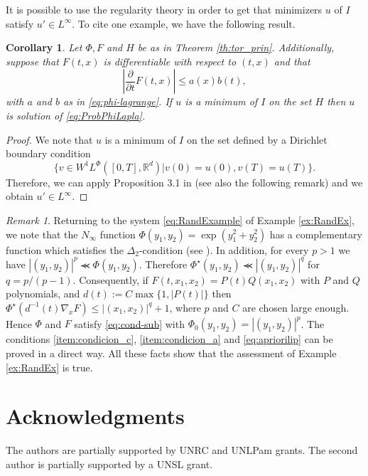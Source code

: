 \documentclass[twoside]{article}
\newtheorem{cor}[thm]{Corollary}
\theoremstyle{remark}
\newtheorem{comentario}{Remark}
\newcounter{example}[section]
\newcommand{\lphi}{L^{\Phi}}
\newcommand{\wphi}{W^{1}\lphi}
\newcommand{\rr}{\mathbb{R}}
\renewcommand{\leq}{\leqslant}
\newcommand{\Phie}{\Phi^{\star}}
\begin{document}
It is possible to use the regularity theory in order to get  that minimizers $u$ of $I$ satisfy $u'\in L^{\infty}$. To cite one example, we have the following result.

\begin{cor} Let $\Phi,F$ and $H$ be as in Theorem \ref{th:tor_prin}. Additionally, suppose that
$F(t,x)$ is differentiable with respect to $(t,x)$ and that 
\begin{equation}\label{eq:apriorilip}\left| \frac{\partial}{\partial t} F(t,x)\right|  \leq a(x)b(t),\end{equation}
with $a$ and $b$ as in \eqref{eq:phi-lagrange}. 
 If $u$ is a minimum of $I$ on the set $H$ then $u$ is solution of \eqref{eq:ProbPhiLapla}. 
 
\end{cor}

\begin{proof} We note that $u$ is a minimum of $I$ on the set defined by a Dirichlet boundary condition
\[\{v\in\wphi([0,T],\rr^d)| v(0)=u(0), v(T)=u(T)\}.\]
Therefore, we can apply Proposition 3.1 in \cite{clarke1985regularity} (see also the following remark) and we obtain $u'\in L^{\infty}$.
\end{proof}

\begin{comentario}\label{com:ejemplo} Returning to the system \eqref{eq:RandExample} of Example \ref{ex:RandEx},
we note that the $N_{\infty}$ function $\Phi(y_1,y_2)=\exp(y_1^2+y_2^2)$ has a  complementary function which satisfies the $\Delta_2$-condition (see \cite[p. 28]{KR}).  In addition, for every $p>1$ we have $|(y_1,y_2)|^p \llcurly \Phi(y_1,y_2)$. Therefore $\Phie(y_1,y_2)\llcurly|(y_1,y_2)|^q $ for $q=p/(p-1)$. Consequently,  if $F(t,x_1,x_2)=P(t)Q(x_1,x_2)$ with $P$ and $Q$ polynomials, and $d(t):=C\max\{1,|P(t)|\}$  then $\Phie(d^{-1}(t)\nabla_xF)\leq |(x_1,x_2)|^q+1$,  where $p$ and $C$ are chosen large enough. Hence $\Phi$ and $F$ satisfy \eqref{eq:cond-sub} with $\Phi_0(y_1,y_2)=|(y_1,y_2)|^p$.  The conditions  \ref{item:condicion_c}, \ref{item:condicion_a}  and \eqref{eq:apriorilip} can be proved in a direct way. All these facts show that the assessment of Example \ref{ex:RandEx} is true.  
 
\end{comentario}

\section*{Acknowledgments}
The authors are partially supported by  UNRC and UNLPam grants. The second author is  partially supported by a  UNSL grant. 




% 
 
 

\end{document}

